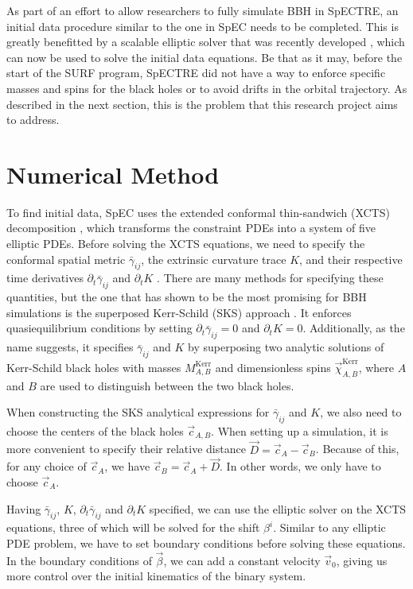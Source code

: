 \documentclass{../document}
\begin{document}
	As part of an effort to allow researchers to fully simulate BBH in SpECTRE, an initial data procedure similar to the one in SpEC needs to be completed. This is greatly benefitted by a scalable elliptic solver that was recently developed \cite{Vu}, which can now be used to solve the initial data equations. Be that as it may, before the start of the SURF program, SpECTRE did not have a way to enforce specific masses and spins for the black holes or to avoid drifts in the orbital trajectory. As described in the next section, this is the problem that this research project aims to address.
  
  \section{Numerical Method}

  To find initial data, SpEC uses the extended conformal thin-sandwich (XCTS) decomposition \cite{Serguei}, which transforms the constraint PDEs into a system of five elliptic PDEs. Before solving the XCTS equations, we need to specify the conformal spatial metric $\bar\gamma_{ij}$, the extrinsic curvature trace $K$, and their respective time derivatives $\partial_t \bar\gamma_{ij}$ and $\partial_t K$ \cite{BaumgarteShapiro}. There are many methods for specifying these quantities, but the one that has shown to be the most promising for BBH simulations is the superposed Kerr-Schild (SKS) approach \cite{Lovelace2008}. It enforces quasiequilibrium conditions by setting $\partial_t \bar\gamma_{ij}=0$ and $\partial_t K=0$. Additionally, as the name suggests, it specifies $\bar\gamma_{ij}$ and $K$ by superposing two analytic solutions of Kerr-Schild black holes with masses $M^\text{Kerr}_{A,B}$ and dimensionless spins $\vec\chi^\text{Kerr}_{A,B}$, where $A$ and $B$ are used to distinguish between the two black holes.

  When constructing the SKS analytical expressions for $\bar\gamma_{ij}$ and $K$, we also need to choose the centers of the black holes $\vec c_{A,B}$. When setting up a simulation, it is more convenient to specify their relative distance $\vec D=\vec c_A - \vec c_B$. Because of this, for any choice of $\vec c_A$, we have $\vec c_B = \vec c_A + \vec D$. In other words, we only have to choose $\vec c_A$.

  Having $\bar\gamma_{ij}$, $K$, $\partial_t \bar\gamma_{ij}$ and $\partial_t K$ specified, we can use the elliptic solver on the XCTS equations, three of which will be solved for the shift $\beta^i$. Similar to any elliptic PDE problem, we have to set boundary conditions before solving these equations. In the boundary conditions of $\vec\beta$, we can add a constant velocity $\vec v_0$, giving us more control over the initial kinematics of the binary system.
\end{document}
